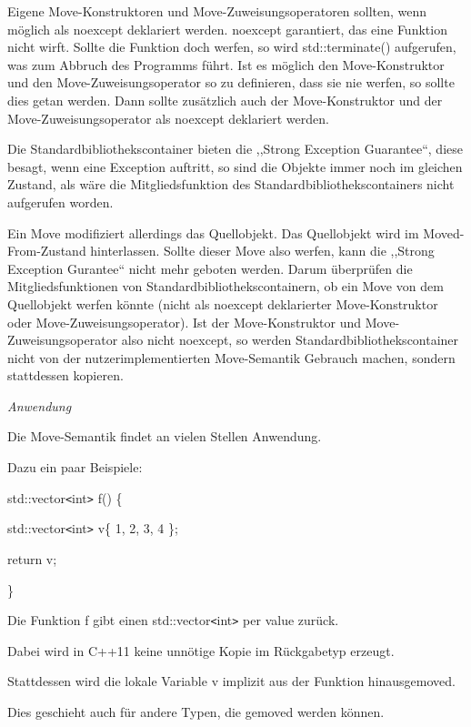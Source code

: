 \documentclass{article}
\begin{document}
Eigene Move-Konstruktoren und Move-Zuweisungsoperatoren sollten, wenn möglich 
als noexcept deklariert werden. noexcept garantiert, das eine Funktion nicht wirft. 
Sollte die Funktion doch werfen, so wird std::terminate() aufgerufen, was zum Abbruch 
des Programms führt. Ist es möglich den Move-Konstruktor und den Move-Zuweisungsoperator 
so zu definieren, dass sie nie werfen, so sollte dies getan werden. Dann sollte 
zusätzlich auch der Move-Konstruktor und der Move-Zuweisungsoperator als noexcept 
deklariert werden.

Die Standardbibliothekscontainer bieten die ,,Strong Exception Guarantee``, diese 
besagt, wenn eine Exception auftritt, so sind die Objekte immer noch im gleichen 
Zustand, als wäre die Mitgliedsfunktion des Standardbibliothekscontainers nicht 
aufgerufen worden.

Ein Move modifiziert allerdings das Quellobjekt. Das Quellobjekt wird im Moved-From-Zustand 
hinterlassen. Sollte dieser Move also werfen, kann die ,,Strong Exception Gurantee`` 
nicht mehr geboten werden. Darum überprüfen die Mitgliedsfunktionen von Standardbibliothekscontainern, 
ob ein Move von dem Quellobjekt werfen könnte (nicht als noexcept deklarierter 
Move-Konstruktor oder Move-Zuweisungsoperator). Ist der Move-Konstruktor und Move-Zuweisungsoperator 
also nicht noexcept, so werden Standardbibliothekscontainer nicht von der nutzerimplementierten 
Move-Semantik Gebrauch machen, sondern stattdessen kopieren.

\vspace{12pt}
\emph{Anwendung}

Die Move-Semantik findet an vielen Stellen Anwendung.

Dazu ein paar Beispiele:

\vspace{12pt}
std::vector\texttt{<}int\texttt{>} f() \{    

\parindent=14pt
std::vector\texttt{<}int\texttt{>} v\{ 1, 2, 3, 4 \};    

return v;

\}

\vspace{12pt}
\parindent=0pt
Die Funktion f gibt einen std::vector\texttt{<}int\texttt{>} per value zurück.

Dabei wird in C++11 keine unnötige Kopie im Rückgabetyp erzeugt.

Stattdessen wird die lokale Variable v implizit aus der Funktion hinausgemoved.

Dies geschieht auch für andere Typen, die gemoved werden können.
\end{document}
